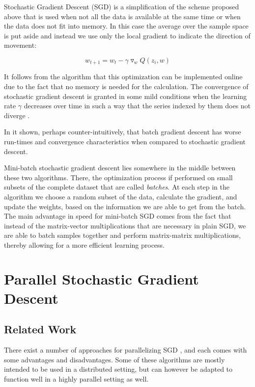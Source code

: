 \documentclass[11pt,a4paper]{article}
\begin{document}
Stochastic Gradient Descent (SGD) is a simplification of the scheme proposed above that is used
when not all the data is available at the same time or when the data does not fit into memory. In
this case the average over the sample space is put aside and instead we use only the local gradient
to indicate the direction of movement:

\begin{equation}
w_{t + 1} = w_t - \gamma  \triangledown_w Q(z_i, w)
\end{equation}

It follows from the algorithm that this optimization can be implemented online due to the fact that
no memory is needed for the calculation. The convergence of stochastic gradient descent is granted
in  some mild conditions when the learning rate $\gamma$ decreases over time in such a way that the
series  indexed by them does not diverge \citep{bottou2010large}.

In \citep{wilson2003general} it shown, perhaps counter-intuitively, that batch gradient descent has
worse run-times and convergence characteristics when compared to stochastic gradient descent.

Mini-batch stochastic gradient descent lies somewhere in the middle between these two algorithms.
There, the optimization process if performed on small subsets of the complete dataset that are
called \textit{batches}. At each step in the algorithm we choose a random subset of the data,
calculate the gradient, and update the weights, based on the information we are able to get from
the batch. The main advantage in speed for mini-batch SGD comes from the fact that instead of the
matrix-vector multiplications that are necessary in plain SGD, we are able to batch samples
together and perform matrix-matrix multiplications, thereby allowing for a more efficient learning
process.

\section{Parallel Stochastic Gradient Descent}
\subsection{Related Work}

There exist a number of approaches for parallelizing SGD \citep{zinkevich2010parallelized,
recht2011hogwild, dekel2012optimal}, and each comes with some advantages and disadvantages. Some of
these algorithms are mostly intended to be used in a distributed setting, but can however be
adapted to function well in a highly parallel setting as well.
\end{document}
